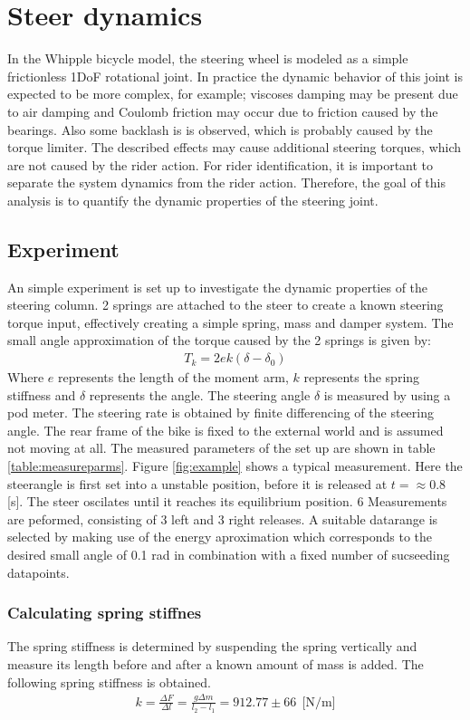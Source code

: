 \chapter{Steer dynamics}
In the Whipple bicycle model, the steering wheel is modeled as a simple frictionless 1DoF rotational joint. In practice the dynamic behavior of this joint is expected to be more complex, for example; viscoses damping may be present due to air damping and Coulomb friction may occur due to friction caused by the bearings. Also some backlash is is observed, which is probably caused by the  torque limiter. The described effects may cause additional steering torques, which are not caused by the rider action. For rider identification, it is important to separate the system dynamics from the rider action. Therefore, the goal of this analysis is to quantify the dynamic properties of the steering joint.
\section{Experiment}
An simple experiment is set up to investigate the dynamic properties of the steering column. 2 springs are attached to the steer to create a known steering torque input, effectively creating a simple spring, mass and damper system. The small angle approximation of the torque caused by the 2 springs is given by:
		\begin{align}
		T_k = 2ek(\delta-\delta_0)
		\end{align}
Where $e$ represents the length of the moment arm, $k$ represents the spring stiffness and $\delta$ represents the angle. The steering angle $\delta$ is measured by using a pod meter. The steering rate is obtained by finite differencing of the steering angle. The rear frame of the bike is fixed to the external world and is assumed not moving at all. The measured parameters of the set up are shown in table \ref{table:measureparms}. Figure \ref{fig:example} shows a typical measurement. Here the steerangle is first set into a unstable position, before it is released at $t=\approx0.8$ [s]. The steer oscilates until it reaches its equilibrium position. 6 Measurements are peformed, consisting of 3 left and 3 right releases. A suitable datarange is selected by making use of the energy aproximation which corresponds to the desired small angle of 0.1 rad in combination with a fixed number of sucseeding datapoints.
\subsection{Calculating spring stiffnes}
The spring stiffness is determined by suspending the spring vertically and measure its length before and after a known amount of mass is added. The following spring stiffness is obtained.
\begin{align}
		k = \frac{\Delta F}{\Delta l} = \frac{g\Delta m}{l_2-l_1} = 912.77 \pm 66 \ \ \textrm{[N/m]}
\end{align}
